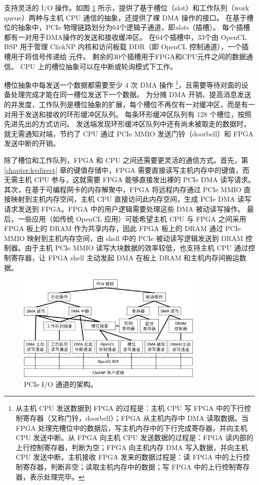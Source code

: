 \name 支持灵活的 I/O 操作。如图 \ref{clicknp:fig:pcie-io} 所示，\name 提供了基于槽位（slot）和工作队列（work queue）两种与主机 CPU 通信的抽象，还提供了裸 DMA 操作的接口。
在基于槽位的抽象中，PCIe 物理链路划分为64个逻辑子通道，即\textit {slots}（插槽）。
每个插槽都有一对用于DMA操作的发送和接收缓冲区。
在64个插槽中，33个由 OpenCL BSP 用于管理 ClickNP 内核和访问板载 DDR（即 OpenCL 控制通道），一个插槽用于将信号传递给 \name 元件。
剩余的30个插槽用于FPGA和CPU元件之间的数据通信。
CPU 上的槽位抽象可以在中断或轮询模式下工作。

槽位抽象中每发送一个数据都需要至少 4 次 DMA 操作 \footnote{从主机 CPU 发送数据到 FPGA 的过程是：主机 CPU 写 FPGA 中的下行控制寄存器（又称门铃，doorbell）；FPGA 从主机内存中 DMA 读取数据。当 FPGA 处理完槽位中的数据后，写主机内存中的下行完成寄存器，并向主机 CPU 发送中断。从 FPGA 向主机 CPU 发送数据的过程是：FPGA 读内部的上行控制寄存器，判断为空；FPGA 向主机内存 DMA 写入数据，并向主机 CPU 发送中断。主机接收 FPGA 发来的数据过程是：读 FPGA 中的上行控制寄存器，判断非空；读取主机内存中的数据；写 FPGA 中的上行控制寄存器，表示处理完毕。}，且需要等待对面的设备处理完成才能在同一槽位发送下一个数据。
为分摊 DMA 开销、提高消息发送的并发度，工作队列是槽位抽象的扩展，每个槽位不再仅有一对缓冲区，而是有一对用于发送和接收的环形缓冲区队列。
每条环形缓冲区队列有 128 个槽位，按照先进先出的方式访问。
发送端发现环形缓冲区队列中还有尚未被取走的数据时，就无需通知对端，节约了 CPU 通过 PCIe MMIO 发送门铃（doorbell）和 FPGA 发送中断的开销。

除了槽位和工作队列，FPGA 和 CPU 之间还需要更灵活的通信方式。首先，第 \ref{chapter:kvdirect} 章的键值存储中，FPGA 需要直接读写主机内存中的键值，而无需主机 CPU 参与，这就需要 FPGA 能够直接发出裸的 PCIe DMA 读写请求。
其次，在基于可编程网卡的内存解聚中，FPGA 将远程内存通过 PCIe MMIO 直接映射到主机内存空间，主机 CPU 直接访问此内存空间，生成 PCIe DMA 读写请求发送到 FPGA。FPGA 中的用户逻辑需要处理这些 DMA 被动读写操作。
最后，一些应用（如传统 OpenCL 应用）可能希望主机 CPU 与 FPGA 之间采用 FPGA 板上的 DRAM 作为共享内存，因此 FPGA 板上的 DRAM 通过 PCIe MMIO 映射到主机内存空间，由 shell 中的 PCIe 被动读写逻辑发送到 DRAM 控制器。由于主机 PCIe MMIO 读写大块数据的效率较低，也支持主机 CPU 通过控制寄存器，让 FPGA shell 主动发起 DMA 在板上 DRAM 和主机内存间搬运数据。



\begin{figure}[htbp]
	\centering
	\includegraphics[width=0.8\textwidth]{image/pcie-io}
	\caption{PCIe I/O 通道的架构。}
	\label{clicknp:fig:pcie-io}
\end{figure}

